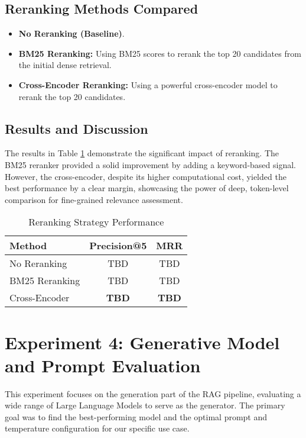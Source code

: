 \subsection{Reranking Methods Compared}
\begin{itemize}
    \item \textbf{No Reranking (Baseline)}.
    \item \textbf{BM25 Reranking:} Using BM25 scores to rerank the top 20 candidates from the initial dense retrieval.
    \item \textbf{Cross-Encoder Reranking:} Using a powerful cross-encoder model to rerank the top 20 candidates.
\end{itemize}
\subsection{Results and Discussion}
The results in Table \ref{tab:reranking_results} demonstrate the significant impact of reranking. The BM25 reranker provided a solid improvement by adding a keyword-based signal. However, the cross-encoder, despite its higher computational cost, yielded the best performance by a clear margin, showcasing the power of deep, token-level comparison for fine-grained relevance assessment.

\begin{table}[!htbp]
\centering
\caption{Reranking Strategy Performance}
\label{tab:reranking_results}
\begin{tabular}{|l|c|c|}
\hline
\textbf{Method} & \textbf{Precision@5} & \textbf{MRR} \\
\hline
No Reranking & TBD & TBD \\
BM25 Reranking & TBD & TBD \\
Cross-Encoder & \textbf{TBD} & \textbf{TBD} \\
\hline
\end{tabular}
\end{table}

\section{Experiment 4: Generative Model and Prompt Evaluation}
\label{sec:exp_generator_prompt}
This experiment focuses on the generation part of the RAG pipeline, evaluating a wide range of Large Language Models to serve as the generator. The primary goal was to find the best-performing model and the optimal prompt and temperature configuration for our specific use case.


